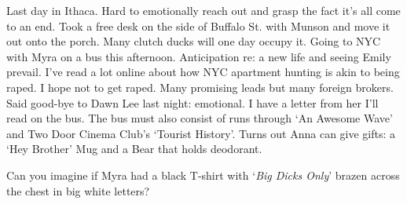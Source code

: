 Last day in Ithaca. Hard to emotionally reach out and grasp the fact it's all come to an end. Took a free desk on the side of Buffalo St. with Munson and move it out onto the porch. Many clutch ducks will one day occupy it. Going to NYC with Myra on a bus this afternoon. Anticipation re: a new life and seeing Emily prevail. I've read a lot online about how NYC apartment hunting is akin to being raped. I hope not to get raped. Many promising leads but many foreign brokers. Said good-bye to Dawn Lee last night: emotional. I have a letter from her I'll read on the bus. The bus must also consist of runs through `An Awesome Wave' and Two Door Cinema Club's `Tourist History'. Turns out Anna can give gifts: a `Hey Brother' Mug and a Bear that holds deodorant. 

Can you imagine if Myra had a black T-shirt with `\emph{Big Dicks Only}' brazen across the chest in big white letters?

